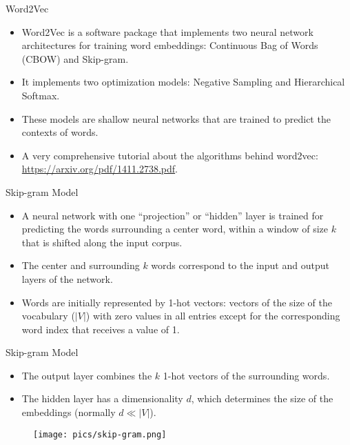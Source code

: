 \documentclass[handout]{beamer}
\begin{document}
\begin{frame}{Word2Vec}
\begin{scriptsize}
\begin{itemize}
\item Word2Vec is a software package that implements two neural network architectures for training word embeddings:  Continuous Bag of Words (CBOW) and Skip-gram.
\item It implements two  optimization models: Negative Sampling and Hierarchical Softmax.
\item These models are shallow neural networks that are trained to predict the contexts of words.

\item A very comprehensive tutorial about the algorithms behind word2vec: \url{https://arxiv.org/pdf/1411.2738.pdf}.

\end{itemize}
\end{scriptsize}
\end{frame}



\begin{frame}{Skip-gram Model}
\begin{scriptsize}
\begin{itemize}
\item A neural network with one ``projection'' or ``hidden'' layer is trained for predicting the words surrounding a center word, within a window  of size $k$ that is shifted along the input corpus. 
\item The center and surrounding $k$ words correspond to the input and output layers of the network.
\item Words are initially represented by 1-hot vectors: vectors of the size of the vocabulary ($|V|$) with zero values in all entries except for the corresponding word index that receives a value of 1. 
\end{itemize}
\end{scriptsize}

\end{frame}



\begin{frame}{Skip-gram Model}
\begin{scriptsize}
\begin{itemize}
\item The output layer combines the $k$ 1-hot vectors of the surrounding words. 
\item The hidden layer has a dimensionality $d$, which determines the size of the embeddings (normally $d \ll |V|$).
\end{itemize}
\end{scriptsize}
  \begin{figure}[h]
        	\texttt{[image: pics/skip-gram.png]}
        \end{figure}

\end{frame}
\end{document}
